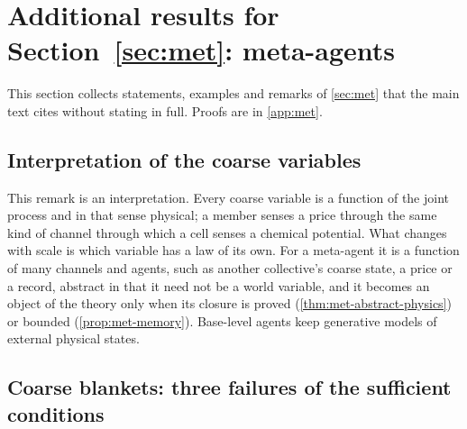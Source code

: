 \section{Additional results for \texorpdfstring{Section~\ref{sec:met}}{Section 11}: meta-agents}\label{sup:met}

This section collects statements, examples and remarks of \cref{sec:met} that the main text cites without stating in full. Proofs are in \cref{app:met}.

\subsection{Interpretation of the coarse variables}\label{sup:met-interpretation-of-the-coarse-variables}

\begin{remark}\label{rem:met-abstract}
This remark is an interpretation. Every coarse variable is a function of the joint process and in that sense physical; a member senses a price through the same kind of channel through which a cell senses a chemical potential. What changes with scale is which variable has a law of its own. For a meta-agent it is a function of many channels and agents, such as another collective's coarse state, a price or a record, abstract in that it need not be a world variable, and it becomes an object of the theory only when its closure is proved (\cref{thm:met-abstract-physics}) or bounded (\cref{prop:met-memory}). Base-level agents keep generative models of external physical states.
\end{remark}

\subsection{Coarse blankets: three failures of the sufficient conditions}\label{sup:met-coarse-blankets-three-failures-of-the-su}

